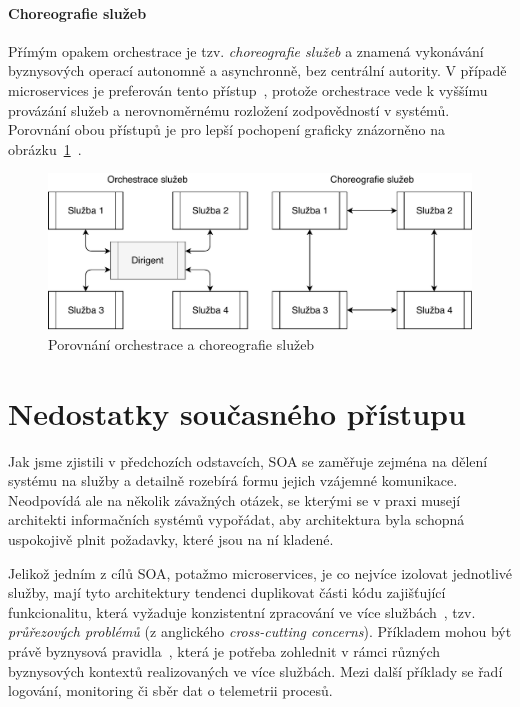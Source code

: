 \paragraph{Choreografie služeb}
Přímým opakem orchestrace je tzv. \textit{choreografie služeb} a znamená
vykonávání byznysových operací autonomně a asynchronně, bez centrální
autority. V případě microservices je preferován tento přístup~\cite{dragoni2017microservices},
protože orchestrace vede k vyššímu provázání služeb a nerovnoměrnému rozložení
zodpovědností v systémů. Porovnání obou přístupů je pro lepší pochopení graficky
znázorněno na obrázku~\ref{fig:choreography-orchestration}~\cite{orchestrationvschoreography}.

\begin{figure}
    \centering
    \includegraphics[keepaspectratio=true, width=0.8\linewidth]{figures/choreography-orchestration.pdf}
    \caption{Porovnání orchestrace a choreografie služeb}
    \label{fig:choreography-orchestration}
\end{figure}

\section{Nedostatky současného přístupu}

Jak jsme zjistili v předchozích odstavcích, \gls{SOA} se zaměřuje zejména na
dělení systému na služby a detailně rozebírá formu jejich vzájemné komunikace.
Neodpovídá ale na několik závažných otázek, se kterými se v praxi musejí
architekti informačních systémů vypořádat, aby architektura byla schopná uspokojivě
plnit požadavky, které jsou na ní kladené.

Jelikož jedním z cílů \gls{SOA}, potažmo microservices, je co nejvíce izolovat
jednotlivé služby, mají tyto architektury tendenci duplikovat části kódu
zajišťující funkcionalitu, která vyžaduje konzistentní zpracování ve více
službách~\cite{cerny2017disambiguation}, tzv. \textit{průřezových
problémů} (z anglického \textit{cross-cutting concerns}).
Příkladem mohou být právě byznysová pravidla~\cite{cemus2014aspect}, která je potřeba
zohlednit v rámci různých byznysových kontextů realizovaných ve více službách.
Mezi další příklady se řadí logování, monitoring či sběr dat
o telemetrii procesů.

